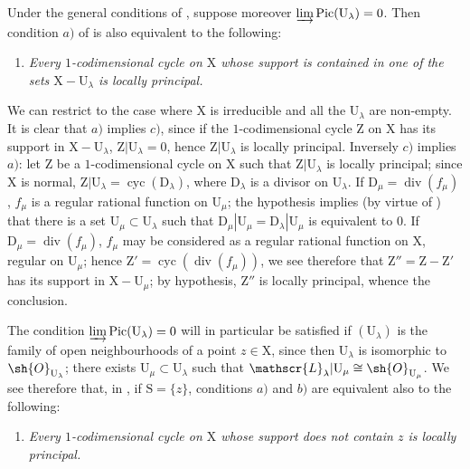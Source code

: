 \begin{remark}[21.13.16]
\label{IV.21.13.16}
Under the general conditions of , suppose moreover $\varinjlim\operatorname{Pic}(\mathrm{U}_\lambda)=0$.
Then condition $a)$ of  is also equivalent to the following:
\begin{enumerate}
  \item[c)] \emph{Every $1$-codimensional cycle on $\mathrm{X}$ whose support is contained in one of the sets $\mathrm{X}-\mathrm{U}_\lambda$ is locally principal.}
\end{enumerate}

We can restrict to the case where $\mathrm{X}$ is irreducible and all the $\mathrm{U}_\lambda$ are non-empty.
It is clear that $a)$ implies $c)$, since if the $1$-codimensional cycle $\mathrm{Z}$ on $\mathrm{X}$ has its support in $\mathrm{X}-\mathrm{U}_\lambda$, $\mathrm{Z}|\mathrm{U}_\lambda=0$, hence $\mathrm{Z}|\mathrm{U}_\lambda$ is locally principal.
Inversely $c)$ implies $a)$: let $\mathrm{Z}$ be a $1$-codimensional cycle on $\mathrm{X}$ such that $\mathrm{Z}|\mathrm{U}_\lambda$ is locally principal; since $\mathrm{X}$ is normal, $\mathrm{Z}|\mathrm{U}_\lambda=\operatorname{cyc}(\mathrm{D}_\lambda)$, where $\mathrm{D}_\lambda$ is a divisor on $\mathrm{U}_\lambda$.
If $\mathrm{D}_\mu=\operatorname{div}(f_\mu)$, $f_\mu$ is a regular rational function on $\mathrm{U}_\mu$; the hypothesis implies (by virtue of ) that there is a set $\mathrm{U}_\mu\subset\mathrm{U}_\lambda$ such that $\mathrm{D}_\mu|\mathrm{U}_\mu=\mathrm{D}_\lambda|\mathrm{U}_\mu$ is equivalent to $0$.
If $\mathrm{D}_\mu=\operatorname{div}(f_\mu)$, $f_\mu$ may be considered as a regular rational function on $\mathrm{X}$, regular on $\mathrm{U}_\mu$; hence $\mathrm{Z}'=\operatorname{cyc}(\operatorname{div}(f_\mu))$, we see therefore that $\mathrm{Z}''=\mathrm{Z}-\mathrm{Z}'$ has its support in $\mathrm{X}-\mathrm{U}_\mu$; by hypothesis, $\mathrm{Z}''$ is locally principal, whence the conclusion.

The condition $\varinjlim\operatorname{Pic}(\mathrm{U}_\lambda)=0$ will in particular be satisfied if $(\mathrm{U}_\lambda)$ is the family of open neighbourhoods of a point $z\in\mathrm{X}$, since then $\mathrm{U}_\lambda$ is isomorphic to $\sh{O}_{\mathrm{U}_\lambda}$; there exists $\mathrm{U}_\mu\subset\mathrm{U}_\lambda$ such that $\mathscr{L}_\lambda|\mathrm{U}_\mu\cong\sh{O}_{\mathrm{U}_\mu}$.
We see therefore that, in , if $\mathrm{S}=\{z\}$, conditions $a)$ and $b)$ are equivalent also to the following:
\begin{enumerate}
  \item[c)] \emph{Every $1$-codimensional cycle on $\mathrm{X}$ whose support does not contain $z$ is locally principal.}
\end{enumerate}


\end{remark}
